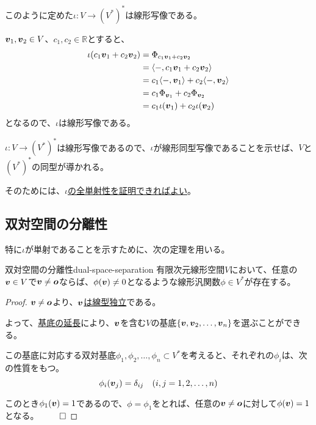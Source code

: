 \documentclass[../../../topic_linear-algebra]{subfiles}
\begin{document}
このように定めた$\iota \colon V \to (V^*)^*$は線形写像である。

\br

\begin{handout}
  $\vb*{v}_1, \vb*{v}_2 \in V$、$c_1, c_2 \in \mathbb{R}$とすると、
  \begin{align*}
    \iota(c_1 \vb*{v}_1 + c_2 \vb*{v}_2) &= \Phi_{c_1 \vb*{v}_1 + c_2 \vb*{v}_2} \\
    &= \langle -, c_1 \vb*{v}_1 + c_2 \vb*{v}_2 \rangle \\
    &= c_1 \langle -, \vb*{v}_1 \rangle + c_2 \langle -, \vb*{v}_2 \rangle \\
    &= c_1 \Phi_{\vb*{v}_1} + c_2 \Phi_{\vb*{v}_2} \\
    &= c_1 \iota(\vb*{v}_1) + c_2 \iota(\vb*{v}_2)
  \end{align*}
  となるので、$\iota$は線形写像である。
\end{handout}

\br

$\iota \colon V \to (V^*)^*$は線形写像であるので、$\iota$が線形同型写像であることを示せば、$V$と$(V^*)^*$の同型が導かれる。

そのためには、\hyperref[def:linear-isomorphism]{$\iota$の全単射性を証明できればよい}。

\subsection{双対空間の分離性}

特に$\iota$が単射であることを示すために、次の定理を用いる。

\begin{theorem}{双対空間の分離性}{dual-space-separation}
  有限次元線形空間$V$において、任意の$\vb*{v} \in V$で$\vb*{v} \neq \vb*{o}$ならば、$\phi(\vb*{v}) \neq 0$となるような線形汎関数$\phi \in V^*$が存在する。
\end{theorem}

\begin{proof}
  $\vb*{v} \neq \vb*{o}$より、\hyperref[thm:single-vec-indep-iff-nonzero]{$\vb*{v}$は線型独立}である。
  
  よって、\hyperref[thm:basis-extension]{基底の延長}により、$\vb*{v}$を含む$V$の基底$\{ \vb*{v}, \vb*{v}_2, \dots, \vb*{v}_n \}$を選ぶことができる。
  
  \br
  
  この基底に対応する双対基底${\phi_1, \phi_2, \dots, \phi_n} \subset V^*$を考えると、それぞれの$\phi_i$は、次の性質をもつ。
  \begin{equation*}
    \phi_i(\vb*{v}_j) = \delta_{ij} \quad (i,j=1,2,\dots,n)
  \end{equation*}
  
  このとき$\phi_1(\vb*{v}) = 1$であるので、$\phi = \phi_1$をとれば、任意の$\vb*{v} \neq \vb*{o}$に対して$\phi(\vb*{v}) = 1$となる。 $\qed$
\end{proof}
\end{document}
